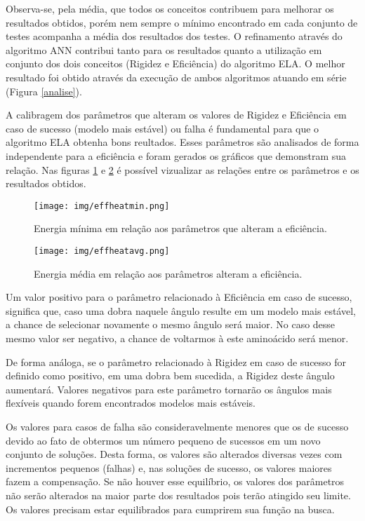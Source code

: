 \documentclass[dm,ppgcomp]{texfurg}
\begin{document}
Observa-se, pela média, que todos os conceitos contribuem para melhorar os resultados obtidos, porém nem sempre o mínimo encontrado em cada conjunto de testes acompanha a média dos resultados dos testes. O refinamento através do algoritmo ANN contribui tanto para os resultados quanto a utilização em conjunto dos dois conceitos (Rigidez e Eficiência) do algoritmo ELA. O melhor resultado foi obtido através da execução de ambos algoritmos atuando em série (Figura \ref{analise}).

A calibragem dos parâmetros que alteram os valores de Rigidez e Eficiência em caso de sucesso (modelo mais estável) ou falha é fundamental para que o algoritmo ELA obtenha bons reultados. Esses parâmetros são analisados de forma independente para a eficiência e foram gerados os gráficos que demonstram sua relação. Nas figuras \ref{effheatmin} e \ref{effheatavg} é possível vizualizar as relações entre os parâmetros e os resultados obtidos.

\begin{figure}[htbp]
  \centering \texttt{[image: img/effheatmin.png]}
\caption{Energia mínima em relação aos parâmetros que alteram a eficiência.} 
\label{effheatmin}
\end{figure}

\begin{figure}[htbp]
  \centering \texttt{[image: img/effheatavg.png]}
\caption{Energia média em relação aos parâmetros alteram a eficiência.} 
\label{effheatavg}
\end{figure}

Um valor positivo para o parâmetro relacionado à Eficiência em caso de sucesso, significa que, caso uma dobra naquele ângulo resulte em um modelo mais estável, a chance de selecionar novamente o mesmo ângulo será maior. No caso desse mesmo valor ser negativo, a chance de voltarmos à este aminoácido será menor.

De forma análoga, se o parâmetro relacionado à Rigidez em caso de sucesso for definido como positivo, em uma dobra bem sucedida, a Rigidez deste ângulo aumentará. Valores negativos para este parâmetro tornarão os ângulos mais flexíveis quando forem encontrados modelos mais estáveis.

Os valores para casos de falha são consideravelmente menores que os de sucesso devido ao fato de obtermos um número pequeno de sucessos em um novo conjunto de soluções. Desta forma, os valores são alterados diversas vezes com incrementos pequenos (falhas) e, nas soluções de sucesso, os valores maiores fazem a compensação. Se não houver esse equilíbrio, os valores dos parâmetros não serão alterados na maior parte dos resultados pois terão atingido seu limite. Os valores precisam estar equilibrados para cumprirem sua função na busca. 
\end{document}
